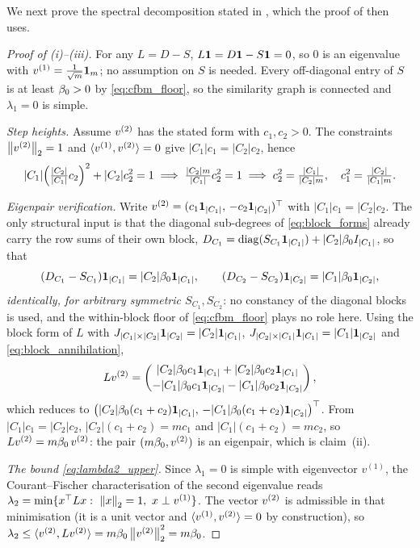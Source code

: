 \noindent We next prove the spectral decomposition stated in ,
which the proof of  then uses.

\begin{proof}[Proof of (i)--(iii)]
For any $L=D-S$, $L\mathbf{1}=D\mathbf{1}-S\mathbf{1}=0$, so $0$ is an eigenvalue with
$v^{(1)}=\tfrac1{\sqrt m}\mathbf{1}_m$; no assumption on $S$ is needed. Every off-diagonal
entry of $S$ is at least $\beta_0>0$ by \eqref{eq:cfbm_floor}, so the similarity graph is
connected and $\lambda_1=0$ is simple.

\emph{Step heights.} Assume $v^{(2)}$ has the stated form with $c_1,c_2>0$. The
constraints $\left\lVert v^{(2)} \right\rVert_2=1$ and $\langle v^{(1)},v^{(2)}\rangle=0$ give $|C_1|c_1=|C_2|c_2$,
hence
\[
   |C_1|\Bigl(\tfrac{|C_2|}{|C_1|}c_2\Bigr)^2+|C_2|c_2^2=1
   \;\Longrightarrow\;\tfrac{|C_2|m}{|C_1|}c_2^2=1
   \;\Longrightarrow\; c_2^2=\tfrac{|C_1|}{|C_2|m},\quad c_1^2=\tfrac{|C_2|}{|C_1|m}.
\]

\emph{Eigenpair verification.} Write $v^{(2)}=(c_1\mathbf{1}_{|C_1|},\,-c_2\mathbf{1}_{|C_2|})^\top$ with
$|C_1|c_1=|C_2|c_2$. The only structural input is that the diagonal sub-degrees of
\eqref{eq:block_forms} already carry the row sums of their own block,
$D_{C_1}=\operatorname{diag}(S_{C_1}\mathbf{1}_{|C_1|})+|C_2|\beta_0 I_{|C_1|}$, so that
\begin{equation}\label{eq:block_annihilation}
   (D_{C_1}-S_{C_1})\mathbf{1}_{|C_1|}=|C_2|\beta_0\mathbf{1}_{|C_1|},\qquad(D_{C_2}-S_{C_2})\mathbf{1}_{|C_2|}=|C_1|\beta_0\mathbf{1}_{|C_2|},
\end{equation}
\emph{identically, for arbitrary symmetric $S_{C_1},S_{C_2}$}: no constancy of the diagonal
blocks is used, and the within-block floor of \eqref{eq:cfbm_floor} plays no role here.
Using the block form of $L$ with $J_{|C_1|\times|C_2|}\mathbf{1}_{|C_2|}=|C_2|\mathbf{1}_{|C_1|}$,
$J_{|C_2|\times|C_1|}\mathbf{1}_{|C_1|}=|C_1|\mathbf{1}_{|C_2|}$ and \eqref{eq:block_annihilation},
\[
   Lv^{(2)}=
   \begin{pmatrix}
     |C_2|\beta_0 c_1\mathbf{1}_{|C_1|}+|C_2|\beta_0 c_2\mathbf{1}_{|C_1|}\\[2pt]
     -|C_1|\beta_0 c_1\mathbf{1}_{|C_2|}-|C_1|\beta_0 c_2\mathbf{1}_{|C_2|}
   \end{pmatrix},
\]
which reduces to
$\bigl(|C_2|\beta_0(c_1+c_2)\mathbf{1}_{|C_1|},\,-|C_1|\beta_0(c_1+c_2)\mathbf{1}_{|C_2|}\bigr)^\top$. From
$|C_1|c_1=|C_2|c_2$, $|C_2|(c_1+c_2)=mc_1$ and $|C_1|(c_1+c_2)=mc_2$, so $Lv^{(2)}=m\beta_0\,v^{(2)}$: the pair
$(m\beta_0,v^{(2)})$ is an eigenpair, which is claim~(ii).

\emph{The bound \eqref{eq:lambda2_upper}.} Since $\lambda_1=0$ is simple with
eigenvector $v^{(1)}$, the Courant--Fischer characterisation of the second
eigenvalue reads $\lambda_2=\min\{x^\top Lx:\ \norm{x}_2=1,\ x\perp v^{(1)}\}$. The
vector $v^{(2)}$ is admissible in that minimisation (it is a unit vector and
$\langle v^{(1)},v^{(2)}\rangle=0$ by construction), so
$\lambda_2\le\langle v^{(2)},Lv^{(2)}\rangle=m\beta_0\left\lVert v^{(2)} \right\rVert_2^2=m\beta_0$.
\end{proof}

